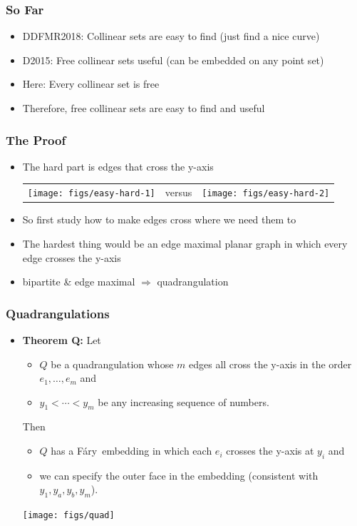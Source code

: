 \documentclass[xcolor=dvipsnames]{beamer}
\newcommand{\Fary}{F\'ary}
\begin{document}
\begin{frame}
   \frametitle{So Far}

   \begin{itemize}
       \item<+-> DDFMR2018: Collinear sets are easy to find (just find a nice curve)
       \item<+-> D2015: Free collinear sets useful (can be embedded on any point set)
       \item<+-> Here: Every collinear set is free
       \item<+-> Therefore, free collinear sets are easy to find and useful
   \end{itemize}
\end{frame}

\begin{frame}
   \frametitle{The Proof}
   \begin{itemize}[<+->]
     \item The hard part is edges that cross the y-axis
     \begin{tabular}{m{4cm}m{1cm}m{4cm}}
      \texttt{[image: figs/easy-hard-1]}& versus& \texttt{[image: figs/easy-hard-2]}
     \end{tabular}
     \item So first study how to make edges cross where we need them to
     \item The hardest thing would be an edge maximal planar graph in which
       every edge crosses the y-axis
     \item bipartite \& edge maximal $\Rightarrow$ quadrangulation
   \end{itemize}

\end{frame}


\begin{frame}
   \frametitle{Quadrangulations}
   \begin{itemize}
     \item \textbf{Theorem Q:} Let 
        \begin{itemize}
          \item $Q$ be a quadrangulation whose $m$ edges all cross the y-axis in the order $e_1,\ldots,e_m$ and
          \item $y_1<\cdots<y_m$ be any increasing sequence of numbers.
        \end{itemize}
        Then
        \begin{itemize}
           \item $Q$ has a \Fary\ embedding in which each $e_i$ crosses the y-axis at $y_i$ and
           \item we can specify the outer face in the embedding (consistent with $y_1,y_a,y_b,y_m$).
        \end{itemize}
        \centerline{\texttt{[image: figs/quad]}}
   \end{itemize}
\end{frame}
\end{document}
